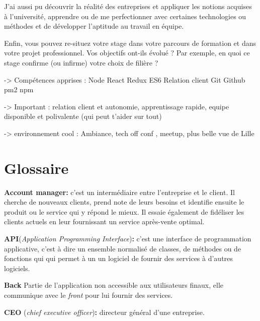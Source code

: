 \documentclass[12pt,a4paper]{article}
\begin{document}
  \bigskip

  J'ai aussi pu découvrir la réalité des entreprises et appliquer les
  notions acquises à l'université, apprendre ou de me perfectionner avec
  certaines technologies ou méthodes et de développer l'aptitude au
  travail en équipe.

  \bigskip

  Enfin, vous pouvez re-situez votre stage dans votre parcours de
  formation et dans votre projet professionnel. Vos objectifs ont-ils
  évolué ? Par exemple, en quoi ce stage confirme (ou infirme) votre choix
  de filière ?

  -\textgreater{} Compétences apprises : Node React Redux ES6 Relation
  client Git Github pm2 npm

  -\textgreater{} Important : relation client et autonomie, apprentissage
  rapide, equipe disponible et polivalente (qui peut t'aider sur tout)

  -\textgreater{} environnement cool : Ambiance, tech off conf , meetup,
  plus belle vue de Lille

  \newpage

  \section{Glossaire}\label{glossaire}

  \textbf{Account manager:} c'est un intermédiaire entre l'entreprise et
  le client. Il cherche de nouveaux clients, prend note de leurs besoins
  et identifie ensuite le produit ou le service qui y répond le mieux. Il
  essaie également de fidéliser les clients actuels en leur fournissant un
  service après-vente optimal.

  \bigskip

  \textbf{API}(\emph{Application Programming Interface})\textbf{:} c'est
  une interface de programmation applicative, c'est à dire un ensemble
  normalisé de classes, de méthodes ou de fonctions qui qui permet à un un
  logiciel de fournir des services à d'autres logiciels.

  \bigskip

  \textbf{Back} Partie de l'application non accessible aux utilisateurs
  finaux, elle communique avec le \emph{front} pour lui fournir des
  services.

  \bigskip

  \textbf{CEO} (\emph{chief executive officer})\textbf{:} directeur
  général d'une entreprise.

  \bigskip
\end{document}
